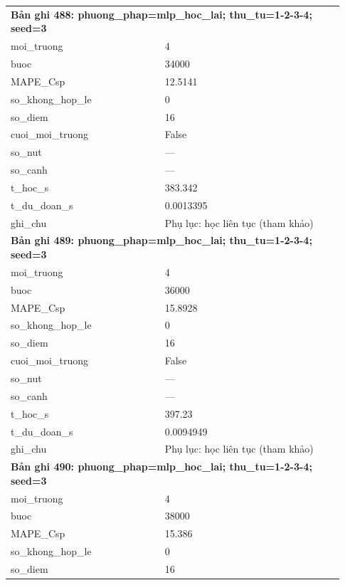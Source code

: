 \begin{longtable}{p{0.43\linewidth}p{0.50\linewidth}}
\midrule
\multicolumn{2}{p{0.95\linewidth}}{\textbf{Bản ghi 488: phuong\_phap=mlp\_hoc\_lai; thu\_tu=1-2-3-4; seed=3}} \\
moi\_\allowbreak truong & 4 \\
buoc & 34000 \\
MAPE\_\allowbreak Csp & 12.5141 \\
so\_\allowbreak khong\_\allowbreak hop\_\allowbreak le & 0 \\
so\_\allowbreak diem & 16 \\
cuoi\_\allowbreak moi\_\allowbreak truong & False \\
so\_\allowbreak nut & — \\
so\_\allowbreak canh & — \\
t\_\allowbreak hoc\_\allowbreak s & 383.342 \\
t\_\allowbreak du\_\allowbreak doan\_\allowbreak s & 0.0013395 \\
ghi\_\allowbreak chu & Phụ lục: học liên tục (tham khảo) \\
\midrule
\multicolumn{2}{p{0.95\linewidth}}{\textbf{Bản ghi 489: phuong\_phap=mlp\_hoc\_lai; thu\_tu=1-2-3-4; seed=3}} \\
moi\_\allowbreak truong & 4 \\
buoc & 36000 \\
MAPE\_\allowbreak Csp & 15.8928 \\
so\_\allowbreak khong\_\allowbreak hop\_\allowbreak le & 0 \\
so\_\allowbreak diem & 16 \\
cuoi\_\allowbreak moi\_\allowbreak truong & False \\
so\_\allowbreak nut & — \\
so\_\allowbreak canh & — \\
t\_\allowbreak hoc\_\allowbreak s & 397.23 \\
t\_\allowbreak du\_\allowbreak doan\_\allowbreak s & 0.0094949 \\
ghi\_\allowbreak chu & Phụ lục: học liên tục (tham khảo) \\
\midrule
\multicolumn{2}{p{0.95\linewidth}}{\textbf{Bản ghi 490: phuong\_phap=mlp\_hoc\_lai; thu\_tu=1-2-3-4; seed=3}} \\
moi\_\allowbreak truong & 4 \\
buoc & 38000 \\
MAPE\_\allowbreak Csp & 15.386 \\
so\_\allowbreak khong\_\allowbreak hop\_\allowbreak le & 0 \\
so\_\allowbreak diem & 16 \\

\end{longtable}
